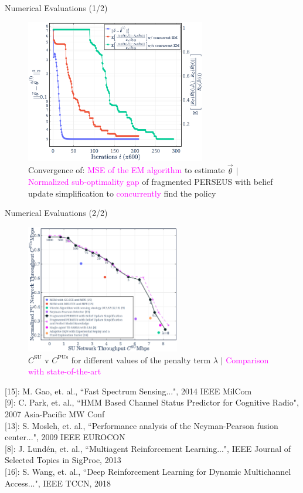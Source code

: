 \documentclass{beamer}
\begin{document}
\begin{frame}{Numerical Evaluations (1/2)}
    \begin{figure}
    \centering
    \includegraphics[width = 0.7\textwidth]{figs/Evaluation_1.png}
    \caption{Convergence of: \textcolor{magenta}{MSE of the EM algorithm} to estimate $\vec{\theta}$ $|$ \textcolor{magenta}{Normalized sub-optimality gap} of fragmented PERSEUS with belief update simplification to \textcolor{magenta}{concurrently} find the policy}
    \label{fig:4b}
\end{figure}
\end{frame}
\begin{frame}{Numerical Evaluations (2/2)}
    \begin{figure}
    \centering
    \includegraphics[width = 0.6\textwidth]{figs/Evaluation_2_Reduced.png}
    \caption{$C^{\text{SU}}$ v $C^{\text{PUs}}$ for different values of the penalty term $\lambda$ $|$ \textcolor{magenta}{Comparison with state-of-the-art}}
    \label{fig:4d}
\end{figure}
\tiny{[15]: M. Gao, et. al., ``Fast Spectrum Sensing...", 2014 IEEE MilCom}
\\\tiny{[9]: C. Park, et. al., ``HMM Based Channel Status Predictor for Cognitive Radio", 2007 Asia-Pacific MW Conf}
\\\tiny{[13]: S. Mosleh, et. al., ``Performance analysis of the Neyman-Pearson fusion center...", 2009 IEEE EUROCON}
\\\tiny{[8]: J. Lund\'{e}n, et. al., ``Multiagent Reinforcement Learning...", IEEE Journal of Selected Topics in SigProc, 2013}
\\\tiny{[16]: S. Wang, et. al., ``Deep Reinforcement Learning for Dynamic Multichannel Access...", IEEE TCCN, 2018}
\end{frame}
\end{document}
